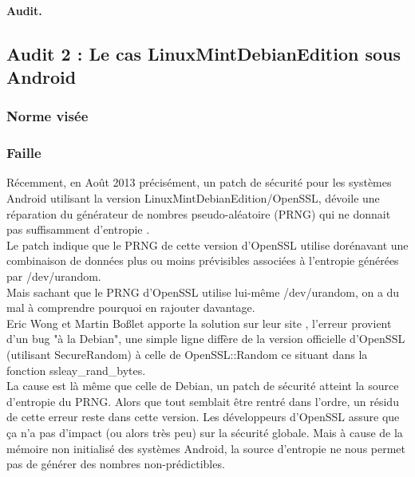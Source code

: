 		
		
		\paragraph{Audit.\\}

	\subsection{Audit 2 : Le cas LinuxMintDebianEdition sous Android}
	\subsubsection{Norme visée}
	\subsubsection{Faille}
	
		Récemment, en Août 2013 précisément, un patch de sécurité pour les 
		systèmes Android utilisant la version LinuxMintDebianEdition/OpenSSL, 
		dévoile une réparation du générateur de nombres pseudo-aléatoire (PRNG) 
		qui ne donnait pas suffisamment d'entropie
		\cite{alex2013android} \cite{bochum2013randomly}. \\
		
		Le patch indique que le PRNG de cette version d'OpenSSL utilise dorénavant 
		une combinaison de données plus ou moins prévisibles associées à 
		l'entropie générées par /dev/urandom. \\
		Mais sachant que le PRNG d'OpenSSL utilise lui-même /dev/urandom, on a du 
		mal à comprendre pourquoi en rajouter davantage.\\
	
		Eric Wong et Martin Boßlet apporte la solution sur leur site
		\cite{boblet2013android}, l'erreur 
		provient d'un bug "à la Debian", une simple ligne diffère de la version 
		officielle d'OpenSSL (utilisant SecureRandom) à celle de OpenSSL::Random 
		ce situant dans la fonction ssleay\_rand\_bytes. \\
	
		La cause est là même que celle de Debian, un patch de sécurité atteint la 
		source d'entropie du PRNG. Alors que tout semblait être rentré dans 
		l'ordre, un résidu de cette erreur reste dans cette version. Les 
		développeurs d'OpenSSL assure que ça n'a pas d'impact (ou alors très peu) 
		sur la sécurité globale. 
		Mais à cause de la mémoire non initialisé des systèmes Android, la source 
		d'entropie ne nous permet pas de générer des nombres non-prédictibles. \\
	
